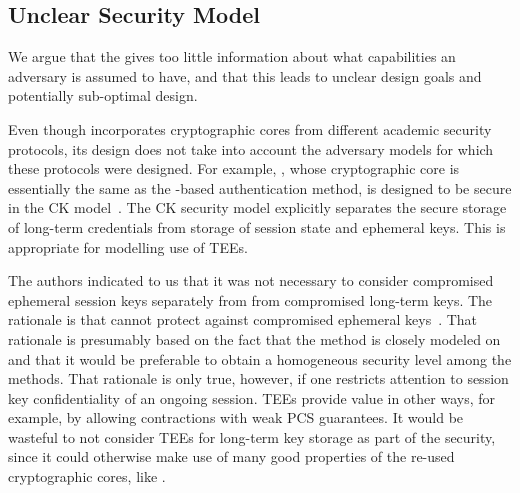 \documentclass[runningheads, envcountsame, hidelinks, a4paper, draft, x11names]{llncs}
\begin{document}
\subsection{Unclear Security Model}
%
We argue that the \mSpec{} gives too little information about what capabilities
an adversary is assumed to have, and that this leads to unclear design goals and
potentially sub-optimal design.
%
%

%
Even though \mEdhoc{} incorporates cryptographic cores from different academic
security protocols, its design does not take into account the adversary models
for which these protocols were designed.
%
For example, \mOptls{}, whose cryptographic core is essentially the same
as the \mStat{}-based authentication method, is designed to be secure in the CK
model~\cite{DBLP:conf/crypto/CanettiK02}.
%
The CK security model explicitly separates the secure storage of long-term
credentials from storage of session state and ephemeral keys.
%
This is appropriate for modelling use of TEEs.
%

The \mEdhoc{} authors indicated to us that it was
not necessary to consider compromised ephemeral session keys separately from
from compromised long-term keys.
%
The rationale is that \mSigma{} cannot protect against compromised ephemeral
keys~\cite{personalCommunication}.
%
That rationale is presumably based on the fact that the \mSigSig{} method is
closely modeled on \mSigmaI{} and that it would be preferable to obtain a
homogeneous security level among the \mEdhoc{}
methods.
%
That rationale is only true, however, if one restricts attention to session key
confidentiality of an ongoing session.
%
TEEs provide value in other ways, for example, by allowing contractions with
weak PCS guarantees.
%
It would be wasteful to not consider TEEs for long-term key storage as part of
the security, since it could otherwise make use of many good properties of the
re-used cryptographic cores, like \mOptls.
%
%
\end{document}
